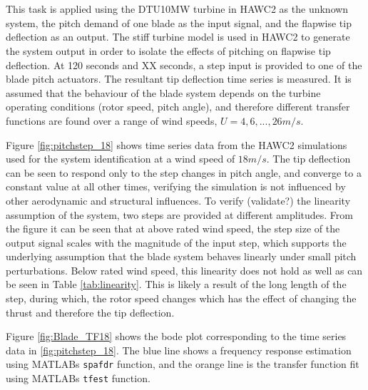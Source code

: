 \\~\\
This task is applied using the DTU10MW turbine in HAWC2 as the unknown system, the pitch demand of one blade as the input signal, and the flapwise tip deflection as an output. The stiff turbine model is used in HAWC2 to generate the system output in order to isolate the effects of pitching on flapwise tip deflection. At 120 seconds and XX seconds, a step input is provided to one of the blade pitch actuators. The resultant tip deflection time series is measured. It is assumed that the behaviour of the blade system depends on the turbine operating conditions (rotor speed, pitch angle), and therefore different transfer functions are found over a range of wind speeds, $U = 4, 6, ..., 26 m/s$. 
 
Figure \ref{fig:pitchstep_18} shows time series data from the HAWC2 simulations used for the system identification at a wind speed of $18m/s$. The tip deflection can be seen to respond only to the step changes in pitch angle, and converge to a constant value at all other times, verifying the simulation is not influenced by other aerodynamic and structural influences. To verify (validate?) the linearity assumption of the system, two steps are provided at different amplitudes. From the figure it can be seen that at above rated wind speed, the step size of the output signal scales with the magnitude of the input step, which supports the underlying assumption that the blade system behaves linearly under small pitch perturbations. Below rated wind speed, this linearity does not hold as well as can be seen in Table \ref{tab:linearity}. This is likely a result of the long length of the step, during which, the rotor speed changes which has the effect of changing the thrust and therefore the tip deflection. 

Figure \ref{fig:Blade_TF18} shows the bode plot corresponding to the time series data in \ref{fig:pitchstep_18}. The blue line shows a frequency response estimation using MATLABs \texttt{spafdr} function, and the orange line is the transfer function fit using MATLABs \texttt{tfest} function. 

